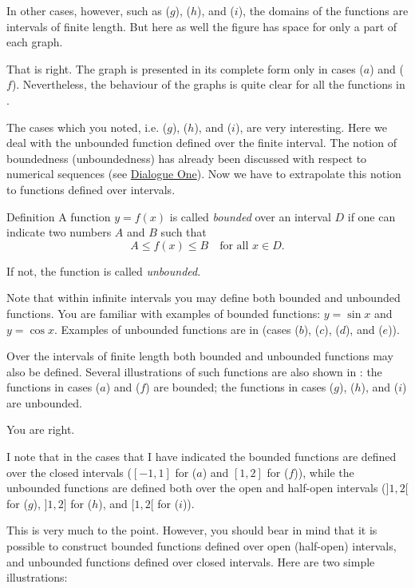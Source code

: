 {\rdr In other cases, however, such as ($g$), ($h$), and ($i$), the domains of the functions are intervals of finite length. But here as well the figure has space for only a part of each graph.

\athr That is right. The graph is presented in its complete form only in cases ($a$) and ($f$). Nevertheless, the behaviour of the graphs is quite clear for all the functions in .

The cases which you noted, i.e. ($g$), ($h$), and ($i$), are very interesting. Here we deal with the unbounded function defined over the finite interval. The notion of boundedness (unboundedness) has already been discussed with respect
to numerical sequences (see \hyperref[infinite-seq]{Dialogue One}). Now we have to extrapolate this notion to functions defined over intervals.
\begin{mytheo}{Definition}
A function $y = f (x)$ is called \emph{bounded} over an interval $D$ if one can indicate two numbers $A$ and $B$ such that 
\begin{equation*}
A \leqslant f (x) \leqslant B \quad \text{for all $x \in D$} .
\end{equation*}
\end{mytheo}
If not, the function	is called \emph{unbounded}. 

Note that within infinite intervals you may define both bounded and unbounded functions. You are familiar with examples of bounded functions: $y = \sin x$ and $y = \cos x$. Examples of unbounded functions are in  (cases ($b$),
($c$), ($d$), and ($e$)).

\rdr Over the intervals of finite length both bounded and unbounded functions may also be defined. Several illustrations of such functions are also shown in : the functions in cases ($a$) and ($f$) are bounded; the functions in cases ($g$), ($h$), and ($i$) are unbounded.

\athr You are right.

\rdr I note that in the cases that I have indicated the bounded functions are defined over the closed intervals ($[-1, 1]$ for ($a$) and $[1, 2]$ for ($f$)), while the unbounded functions are defined both over the open and half-open intervals ($]1, 2[$ for ($g$), $]1, 2]$ for ($h$), and $[1, 2[$ for ($i$)).

\athr This is very much to the point. However, you should bear in mind that it is possible to construct bounded functions defined over open (half-open) intervals, and unbounded functions defined over closed intervals. Here are two simple illustrations:

}

